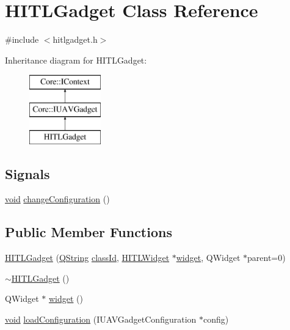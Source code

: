 \hypertarget{class_h_i_t_l_gadget}{\section{\-H\-I\-T\-L\-Gadget \-Class \-Reference}
\label{class_h_i_t_l_gadget}
}


{\ttfamily \#include $<$hitlgadget.\-h$>$}

\-Inheritance diagram for \-H\-I\-T\-L\-Gadget\-:\begin{figure}[H]
\begin{center}
\leavevmode
\includegraphics[height=3.000000cm]{class_h_i_t_l_gadget}
\end{center}
\end{figure}
\subsection*{\-Signals}
\begin{DoxyCompactItemize}
\item 
\hyperlink{group___u_a_v_objects_plugin_ga444cf2ff3f0ecbe028adce838d373f5c}{void} \hyperlink{group___h_i_t_l_plugin_ga13e1705f62c6f94853cd64d477b213ef}{change\-Configuration} ()
\end{DoxyCompactItemize}
\subsection*{\-Public \-Member \-Functions}
\begin{DoxyCompactItemize}
\item 
\hyperlink{group___h_i_t_l_plugin_ga2d1233acc508f6fcd25061c0584d1bab}{\-H\-I\-T\-L\-Gadget} (\hyperlink{group___u_a_v_objects_plugin_gab9d252f49c333c94a72f97ce3105a32d}{\-Q\-String} \hyperlink{group___core_plugin_ga3878fde66a57220608960bcc3fbeef2c}{class\-Id}, \hyperlink{class_h_i_t_l_widget}{\-H\-I\-T\-L\-Widget} $\ast$\hyperlink{group___h_i_t_l_plugin_ga98f16ca8c766c1cd037af671c7f843be}{widget}, \-Q\-Widget $\ast$parent=0)
\item 
\hyperlink{group___h_i_t_l_plugin_ga92376558188a3a1fdff609f2641758e7}{$\sim$\-H\-I\-T\-L\-Gadget} ()
\item 
\-Q\-Widget $\ast$ \hyperlink{group___h_i_t_l_plugin_ga98f16ca8c766c1cd037af671c7f843be}{widget} ()
\item 
\hyperlink{group___u_a_v_objects_plugin_ga444cf2ff3f0ecbe028adce838d373f5c}{void} \hyperlink{group___h_i_t_l_plugin_gad490d49033c38f3e197628890c342634}{load\-Configuration} (\-I\-U\-A\-V\-Gadget\-Configuration $\ast$config)
\end{DoxyCompactItemize}


